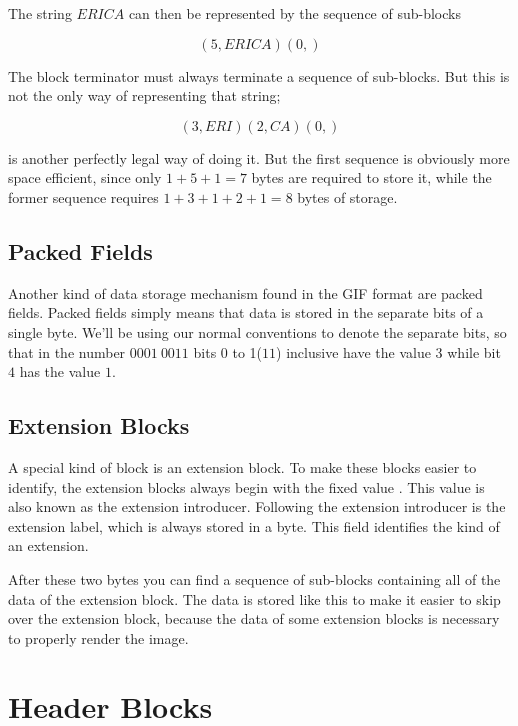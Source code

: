 The string $ERICA$ can then be represented by the sequence of
sub-blocks

\begin{equation*}
  (5,ERICA)(0,)
\end{equation*}

The block terminator must always terminate a sequence of
sub-blocks. But this is not the only way of representing that string;

\begin{equation*}
  (3,ERI)(2,CA)(0,)
\end{equation*}

is another perfectly legal way of doing it. But the first sequence is
obviously more space efficient, since only $1 + 5 + 1 = 7$ bytes are
required to store it, while the former sequence requires $1 + 3 + 1 +
2 + 1 = 8$ bytes of storage.

\subsection{Packed Fields}

Another kind of data storage mechanism found in the GIF format are
packed fields. Packed fields simply means that data is stored in the
separate bits of a single byte. We'll be using our normal conventions
to denote the separate bits, so that in the number $0001\ 0011$ bits 0
to 1($11$) inclusive have the value $3$ while bit $4$ has the value
$1$.

\subsection{Extension Blocks}

A special kind of block is an extension block. To make these blocks
easier to identify, the extension blocks always begin with the fixed
value . This value is also known as the extension
introducer. Following the extension
introducer is the extension label, which is always stored in a
byte. This field identifies the kind of an extension.

After these two bytes you can find a sequence of sub-blocks containing
all of the data of the extension block. The data is stored like this
to make it easier to skip over the extension block, because the data
of some extension blocks is necessary to properly render the image.

\section{Header Blocks}

